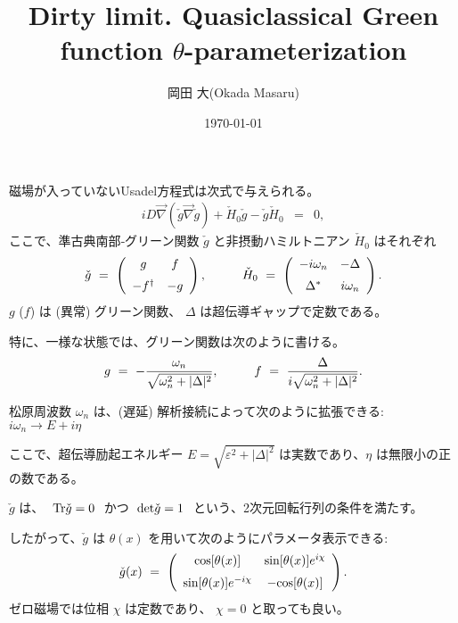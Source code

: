 \documentclass[uplatex,a4j,12pt,dvipdfmx]{jsarticle}
\title{
Dirty limit. Quasiclassical Green function $\theta$-parameterization
}
\author{岡田 大(Okada Masaru)}
\date{\today}
\begin{document}
\maketitle

磁場が入っていないUsadel方程式は次式で与えられる。
\begin{eqnarray}
	i D \vec{\nabla} ( \check{g} \vec{\nabla} \check{g} )
	+ \check{H}_{0} \check{g} - \check{g} \check{H}_{0}
	&=&
	0
	,
\end{eqnarray}
ここで、準古典南部‐グリーン関数 $\check{g}$ と非摂動ハミルトニアン $\check{H}_{0}$ はそれぞれ
\begin{eqnarray}
	\check{g}
	\ = \
	\left(
	\begin{array}{cc}
			g             & f  \\[2mm]
			- f^{\dagger} & -g
		\end{array}
	\right)
	,
	\hspace{10mm}
	\check{H}_{0}
	\ = \
	\left(
	\begin{array}{cc}
			- i \omega_{n} & - \Delta     \\[2mm]
			\Delta^{*}     & i \omega_{n}
		\end{array}
	\right)
	.
\end{eqnarray}
$g$ ($f$) は (異常) グリーン関数、
$\Delta$ は超伝導ギャップで定数である。

特に、一様な状態では、グリーン関数は次のように書ける。
\begin{eqnarray}
	g
	\ = \
	- \dfrac{\omega_{n}}{\sqrt{\omega_{n}^{2} + |\Delta|^{2} }}
	,
	\hspace{10mm}
	f
	\ = \
	\dfrac{\Delta}{i \sqrt{\omega_{n}^{2} + |\Delta|^{2} }}
	.
\end{eqnarray}

松原周波数 $\omega_{n}$ は、(遅延) 解析接続によって次のように拡張できる:
$i \omega_{n} \to E + i \eta$

ここで、超伝導励起エネルギー $E = \sqrt{\varepsilon^{2} + |\Delta|^{2}} $ は実数であり、$\eta$ は無限小の正の数である。

$\check{g}$ は、 $ \ {\rm Tr} \check{g} = 0 \ $ かつ $ \ {\rm det} \check{g} = 1 \ $ という、2次元回転行列の条件を満たす。

したがって、$\check{g}$ は $\theta(x)$ を用いて次のようにパラメータ表示できる:
\begin{eqnarray}
	\check{g}(x)
	\ = \
	\left(
	\begin{array}{cc}
			{\rm cos} [\theta(x)]              & {\rm sin} [\theta(x)] e^{i \chi} \\[2mm]
			{\rm sin} [\theta(x)] e^{- i \chi} & -{\rm cos} [\theta(x)]
		\end{array}
	\right)
	.
\end{eqnarray}
ゼロ磁場では位相 $\chi$ は定数であり、
$\chi=0$ と取っても良い。
\end{document}
